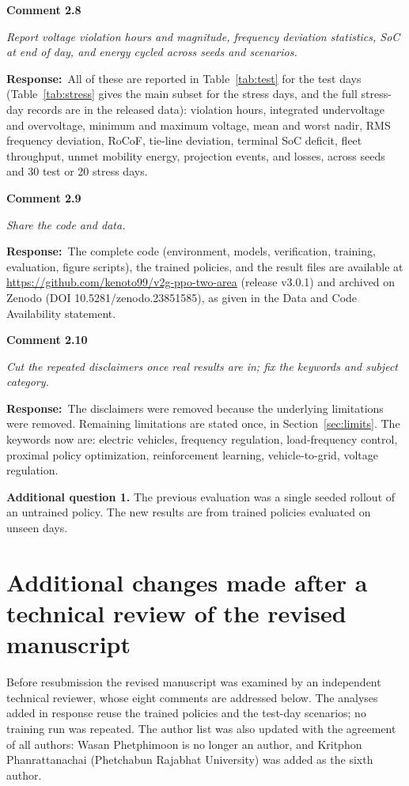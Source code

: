 \documentclass[10pt,a4paper]{article}
\newcommand{\rc}[1]{\par\noindent\textbf{Comment #1}\par}
\newcommand{\resp}{\par\noindent\textbf{Response:}\ }
\begin{document}
\rc{2.8} \emph{Report voltage violation hours and magnitude, frequency
deviation statistics, SoC at end of day, and energy cycled across seeds
and scenarios.}
\resp All of these are reported in Table~\ref{tab:test} for the test days (Table~\ref{tab:stress}
gives the main subset for the stress days, and the full stress-day
records are in the released data): violation hours,
integrated undervoltage and overvoltage, minimum and maximum voltage,
mean and worst nadir, RMS frequency deviation, RoCoF, tie-line
deviation, terminal SoC deficit, fleet throughput, unmet mobility energy, projection events, and
losses, across \NSeed{} seeds and 30 test or 20 stress days.

\rc{2.9} \emph{Share the code and data.}
\resp The complete code (environment, models, verification, training,
evaluation, figure scripts), the trained policies, and the result files
are available at \url{https://github.com/kenoto99/v2g-ppo-two-area}
(release v3.0.1) and archived on Zenodo (DOI 10.5281/zenodo.23851585),
as given in the Data and Code Availability statement.

\rc{2.10} \emph{Cut the repeated disclaimers once real results are in;
fix the keywords and subject category.}
\resp The disclaimers were removed because the underlying limitations
were removed. Remaining limitations are stated once, in Section~\ref{sec:limits}.
The keywords now are: electric vehicles, frequency regulation,
load-frequency control, proximal policy optimization, reinforcement
learning, vehicle-to-grid, voltage regulation.

\textbf{Additional question 1.} The previous evaluation was a single
seeded rollout of an untrained policy. The new results are from
trained policies evaluated on unseen days.


\section*{Additional changes made after a technical review of the revised manuscript}

Before resubmission the revised manuscript was examined by an
independent technical reviewer, whose eight comments are addressed
below. The analyses added in response reuse the trained policies and
the test-day scenarios; no training run was repeated. The author list
was also updated with the agreement of all authors: Wasan Phetphimoon
is no longer an author, and Kritphon Phanrattanachai (Phetchabun
Rajabhat University) was added as the sixth author.
\end{document}
